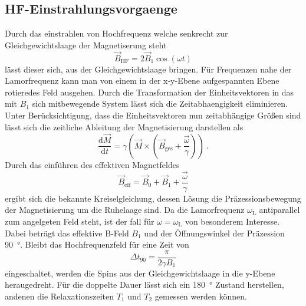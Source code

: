 \subsection{HF-Einstrahlungsvorgaenge}%
\label{sub:hf_einstrahlungsvorgaenge}
Durch das einstrahlen von Hochfrequenz welche senkrecht zur Gleichgewichtslaage
der Magnetiserung steht 
\begin{equation}
		\label{eq:bhf}
		\vec{B}_\text{HF} = 2 \vec{B}_1 \cos(\omega t)
\end{equation}
lässt dieser sich, aus der Gleichgewichtslaage bringen. 
Für Frequenzen nahe der Lamorfrequenz kann man von einem in der x-y-Ebene
aufgespannten Ebene rotieredes Feld ausgehen. 
Durch die Transformation der Einheitsvektoren in das mit $B_1$ sich mitbewegende
System lässt sich die Zeitabhaengigkeit eliminieren. 
Unter Berücksichtigung, dass die Einheitsvektoren nun zeitabhängige Größen sind
lässt sich die zeitliche Ableitung der Magnetisierung darstellen als 
\begin{equation}
		\label{eq:moment}
		\frac{\text{d}\vec{M}}{\text{d} t} = \gamma \left( \vec{M} \times \left(
		\vec{B}_\text{ges} + \frac{\vec{\omega}}{\gamma} \right) \right) \ .
\end{equation}
Durch das einführen des effektiven Magnetfeldes 
\begin{equation}
		\label{eq:sumB}
		\vec{B}_\text{eff} = \vec{B}_0 + \vec{B}_1 + \frac{\vec{\omega}}{\gamma}
\end{equation}
ergibt sich die bekannte Kreiselgleichung, dessen Lösung die
Präzessionsbewegung der Magnetisierung um die Ruhelaage sind. 
Da die Lamorfrequenz $\omega_\text{L}$ antiparallel zum angelgeten Feld steht,
ist der fall für $\omega = \omega_\text{L}$ von besonderem Interesse.
Dabei beträgt das effektive B-Feld $B_1$ und der Öffnungswinkel der
Präzession \SI{90}{\degree}. 
Bleibt das Hochfrequenzfeld für eine Zeit von 
\begin{equation}
		\label{eq:90kick}
		\Delta t_{90} = \frac{\pi}{2 \gamma B_1}
\end{equation}
eingeschaltet, werden die Spins aus der Gleichgewichtslaage in die y-Ebene
heraugedreht. 
Für die doppelte Dauer lässt sich ein \SI{180}{\degree} Zustand herstellen, andenen die
Relaxationszeiten $T_1$ und $T_2$ gemessen werden können. 

